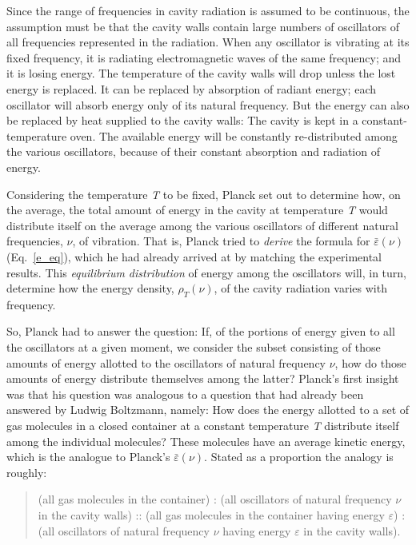 Since the range of frequencies in cavity radiation is assumed to be
continuous, the assumption must be that the cavity walls contain large
numbers of oscillators of all frequencies represented in the radiation.
When any oscillator is vibrating at its fixed frequency, it is radiating
electromagnetic waves of the same frequency; and it is losing energy.
The temperature of the cavity walls will drop unless the lost energy is
replaced. It can be replaced by absorption of radiant energy; each
oscillator will absorb energy only of its natural frequency. But the
energy can also be replaced by heat supplied to the cavity walls: The
cavity is kept in a constant-temperature oven. The available energy will
be constantly re-distributed among the various oscillators, because of
their constant absorption and radiation of energy.

Considering the temperature \emph{T} to be fixed, Planck set out to
determine how, on the average, the total amount of energy in the cavity
at temperature \emph{T} would distribute itself on the average among the
various oscillators of different natural frequencies, $\nu$, of
vibration. That is, Planck tried to \emph{derive} the formula for
$\bar{\varepsilon}(\nu)$ (Eq.~\ref{e_eq}), which he had already arrived at by matching the
experimental results. This \emph{equilibrium distribution} of energy
among the oscillators will, in turn, determine how the energy density,
$\rho_T(\nu)$, of the cavity radiation varies with
frequency.

So, Planck had to answer the question: If, of the portions of energy
given to all the oscillators at a given moment, we consider the subset
consisting of those amounts of energy allotted to the oscillators of
natural frequency $\nu$, how do those amounts of energy distribute
themselves among the latter? Planck's first insight was that his
question was analogous to a question that had already been answered by
Ludwig Boltzmann, namely: How does the energy allotted to a set of gas
molecules in a closed container at a constant temperature \emph{T}
distribute itself among the individual molecules? These molecules have
an average kinetic energy, which is the analogue to Planck's $\bar{\varepsilon}(\nu)$.
Stated as a proportion the analogy is roughly:

\begin{quote}
(all gas molecules in the container) : (all oscillators of natural
frequency $\nu$ in the cavity walls) :: (all gas molecules in the
container having energy $\varepsilon$) : (all oscillators of natural
frequency $\nu$ having energy $\varepsilon$ in the cavity walls).
\end{quote}

